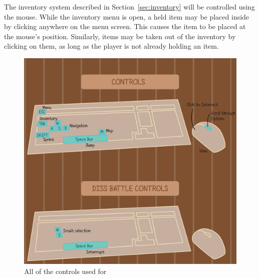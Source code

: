 The inventory system described in Section~\ref{sec:inventory} will be controlled using the mouse. While the inventory menu is open, a held item may be placed inside by clicking anywhere on the menu screen. This causes the item to be placed at the mouse's position. Similarly, items may be taken out of the inventory by clicking on them, as long as the player is not already holding an item.

\begin{figure}[H]
	\centering\includegraphics[width=.5\linewidth]{images/CONTROLS}
    \caption{All of the controls used for \ourgame{}}
    \label{fig:keyboard}
\end{figure}